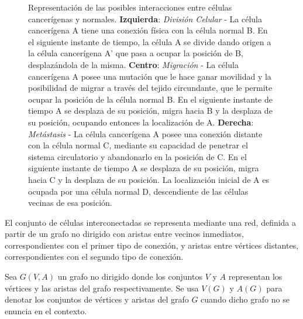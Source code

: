 \begin{figure}[p]
\begin{center}
\end{center}\vspace*{-0.6cm}
\caption[Representaci\'on de las posibles interacciones entre c\'elulas cancer\'igenas y normales]{Representaci\'on de las posibles interacciones entre c\'elulas cancer\'igenas y normales.\newline
\textbf{Izquierda}: \textit{Divisi\'on Celular} - La c\'elula cancer\'igena A tiene una conexi\'on f\'isica con la c\'elula normal B. En el siguiente instante de tiempo, la c\'elula A se divide dando origen a la c\'elula cancer\'igena A' que pasa a ocupar la posici\'on de B, desplaz\'andola de la misma.\newline
\textbf{Centro}: \textit{Migraci\'on} - La c\'elula cancer\'igena A posee una mutaci\'on que le hace ganar movilidad y la posibilidad de migrar a trav\'es del tejido circundante, que le permite ocupar la posici\'on de la c\'elula normal B. En el siguiente instante de tiempo A se desplaza de su posici\'on, migra hacia B y la desplaza de su posici\'on, ocupando entonces la localizaci\'on de A.\newline
\textbf{Derecha}: \textit{Met\'astasis} - La c\'elula cancer\'igena A posee una conexi\'on distante con la c\'elula normal C, mediante su capacidad de penetrar el sistema circulatorio y abandonarlo en la posici\'on de C. En el siguiente instante de tiempo A se desplaza de su posici\'on, migra hacia C y la desplaza de su posici\'on. La localizaci\'on inicial de A es ocupada por una c\'elula normal D, descendiente de las c\'elulas vecinas de esa posici\'on.}
\label{fig-invasion}
\end{figure}

El conjunto de c\'elulas interconectadas se representa mediante una red, definida a partir de un grafo no dirigido con aristas entre vecinos inmediatos, correspondientes con el primer tipo de conexi\'on, y aristas entre v\'ertices distantes, correspondientes con el segundo tipo de conexi\'on.

\begin{definition}
\label{def-graph}
Sea $G(V, A)$ un grafo no dirigido donde los conjuntos $V$ y $A$ representan los v\'ertices y las aristas del grafo respectivamente. Se usa $V(G)$ y $A(G)$ para denotar los conjuntos de v\'ertices y aristas del grafo $G$ cuando dicho grafo no se enuncia en el contexto.
\end{definition}


